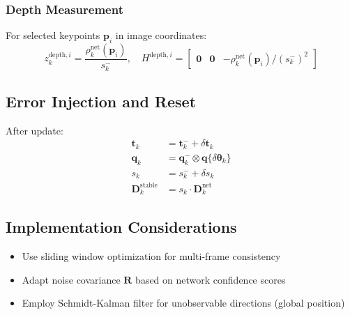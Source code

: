\subsubsection{Depth Measurement}
For selected keypoints $\mathbf{p}_i$ in image coordinates:
\begin{equation}
	z_k^{\text{depth},i} = \frac{\rho_k^{\text{net}}(\mathbf{p}_i)}{s_k^-}, \quad
	H^{\text{depth},i} = \begin{bmatrix}
		\mathbf{0} & \mathbf{0} & -\rho_k^{\text{net}}(\mathbf{p}_i)/(s_k^-)^2
	\end{bmatrix}
\end{equation}

\subsection{Error Injection and Reset}
After update:
\begin{equation}
	\begin{aligned}
		\mathbf{t}_k &= \mathbf{t}_k^- + \delta\mathbf{t}_k \\
		\mathbf{q}_k &= \mathbf{q}_k^- \otimes \mathbf{q}\{\delta\boldsymbol{\theta}_k\} \\
		s_k &= s_k^- + \delta s_k \\
		\mathbf{D}_k^{\text{stable}} &= s_k \cdot \mathbf{D}_k^{\text{net}}
	\end{aligned}
\end{equation}

\subsection{Implementation Considerations}
\begin{itemize}
	\item Use sliding window optimization for multi-frame consistency
	\item Adapt noise covariance $\mathbf{R}$ based on network confidence scores
	\item Employ Schmidt-Kalman filter for unobservable directions (global position)
\end{itemize}
